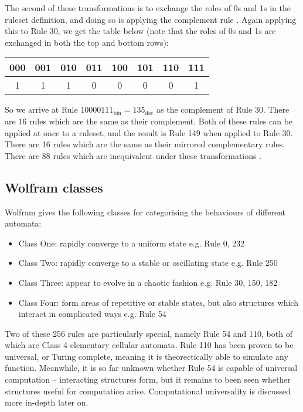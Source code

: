 \documentclass[11pt,a4paper]{article}
\begin{document}
    The second of these transformations is to exchange the roles of 0s and 1s in
    the ruleset definition, and doing so is applying the complement rule
    \cite{elementary}.  Again applying this to Rule 30, we get the table below
    (note that the roles of 0s and 1s are exchanged in both the top and bottom
    rows):

    \begin{table}[h]
        \centering
        \begin{tabular}{|c|c|c|c|c|c|c|c|}\hline
            000 & 001 & 010 & 011 & 100 & 101 & 110 & 111   \\
            \hline
            1 & 1 & 1 & 0 & 0 & 0 & 0 & 1   \\
            \hline
        \end{tabular}
    \end{table}

    So we arrive at Rule $10000111_{\text{bin}} = 135_{\text{dec}}$ as the
    complement of Rule 30. There are 16 rules which are the same as their
    complement.
    Both of these rules can be applied at once to a ruleset, and the result is
    Rule 149 when applied to Rule 30. There are 16 rules which are the same as
    their mirrored complementary rules. There are 88 rules which are
    inequivalent under these transformations \cite{elementary}.

    \subsection{Wolfram classes}
    Wolfram gives the following classes for categorising the behaviours of
    different automata:

    \begin{itemize}
        \item Class One: rapidly converge to a uniform state e.g. Rule 0, 232
        \item Class Two: rapidly converge to a stable or oscillating state e.g.
            Rule 250
        \item Class Three: appear to evolve in a chaotic fashion e.g. Rule 30,
            150, 182
        \item Class Four: form areas of repetitive or stable states, but also
            structures which interact in complicated ways e.g. Rule 54
    \end{itemize}

    Two of these 256 rules are particularly special, namely Rule 54 and 110,
    both of which are Class 4 elementary cellular automata. Rule 110 has been
    proven to be universal, or Turing complete, meaning it is theorectically
    able to simulate any function. Meanwhile, it is so far unknown whether Rule
    54 is capable of universal computation -- interacting structures form, but
    it remains to been seen whether structures useful for computation arise.
    Computational universality is discussed more in-depth later on.
\end{document}
